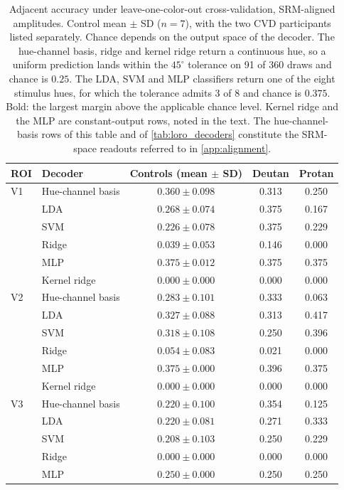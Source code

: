 \begin{table}[h]
\centering
\caption{Adjacent accuracy under leave-one-color-out cross-validation, SRM-aligned amplitudes. Control mean $\pm$ SD ($n = 7$), with the two CVD participants listed separately. Chance depends on the output space of the decoder. The hue-channel basis, ridge and kernel ridge return a continuous hue, so a uniform prediction lands within the $45^\circ$ tolerance on 91 of 360 draws and chance is $0.25$. The LDA, SVM and MLP classifiers return one of the eight stimulus hues, for which the tolerance admits 3 of 8 and chance is $0.375$. Bold: the largest margin above the applicable chance level. Kernel ridge and the MLP are constant-output rows, noted in the text. The hue-channel-basis rows of this table and of \cref{tab:loro_decoders} constitute the SRM-space readouts referred to in \cref{app:alignment}.}
\label{tab:loco_decoders}
\begin{tabular}{llccc}
\toprule
ROI & Decoder & Controls (mean $\pm$ SD) & Deutan & Protan \\
\midrule
V1 & Hue-channel basis & $0.360 \pm 0.098$ & 0.313 & 0.250 \\
   & LDA & $0.268 \pm 0.074$ & 0.375 & 0.167 \\
   & SVM & $0.226 \pm 0.078$ & 0.375 & 0.229 \\
   & Ridge & $0.039 \pm 0.053$ & 0.146 & 0.000 \\
   & MLP & $0.375 \pm 0.012$ & 0.375 & 0.375 \\
   & Kernel ridge & $0.000 \pm 0.000$ & 0.000 & 0.000 \\
\midrule
V2 & Hue-channel basis & $0.283 \pm 0.101$ & 0.333 & 0.063 \\
   & LDA & $0.327 \pm 0.088$ & 0.313 & 0.417 \\
   & SVM & $0.318 \pm 0.108$ & 0.250 & 0.396 \\
   & Ridge & $0.054 \pm 0.083$ & 0.021 & 0.000 \\
   & MLP & $0.375 \pm 0.000$ & 0.396 & 0.375 \\
   & Kernel ridge & $0.000 \pm 0.000$ & 0.000 & 0.000 \\
\midrule
V3 & Hue-channel basis & $0.220 \pm 0.100$ & 0.354 & 0.125 \\
   & LDA & $0.220 \pm 0.081$ & 0.271 & 0.333 \\
   & SVM & $0.208 \pm 0.103$ & 0.250 & 0.229 \\
   & Ridge & $0.000 \pm 0.000$ & 0.000 & 0.000 \\
   & MLP & $0.250 \pm 0.000$ & 0.250 & 0.250 \\

\end{tabular}
\end{table}

